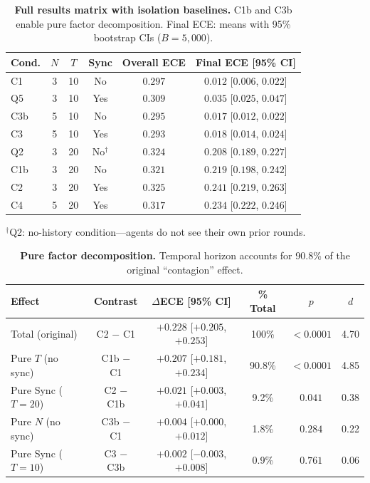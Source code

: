 \documentclass[11pt]{article}
\theoremstyle{definition}
\theoremstyle{remark}
\begin{document}
\begin{table}[H]
\centering
\caption{\textbf{Full results matrix with isolation baselines.} C1b and C3b enable pure factor decomposition. Final ECE: means with 95\% bootstrap CIs ($B{=}5{,}000$).}
\label{tab:results}
\begin{tabular}{@{}lccccc@{}}
\toprule
Cond. & $N$ & $T$ & Sync & Overall ECE & Final ECE [95\% CI] \\
\midrule
C1  & 3 & 10 & No  & $0.297$ & $0.012$ [$0.006$, $0.022$] \\
Q5  & 3 & 10 & Yes & $0.309$ & $0.035$ [$0.025$, $0.047$] \\
C3b & 5 & 10 & No  & $0.295$ & $0.017$ [$0.012$, $0.022$] \\
C3  & 5 & 10 & Yes & $0.293$ & $0.018$ [$0.014$, $0.024$] \\
\midrule
Q2  & 3 & 20 & No$^\dagger$ & $0.324$ & $0.208$ [$0.189$, $0.227$] \\
C1b & 3 & 20 & No  & $0.321$ & $0.219$ [$0.198$, $0.242$] \\
C2  & 3 & 20 & Yes & $0.325$ & $0.241$ [$0.219$, $0.263$] \\
C4  & 5 & 20 & Yes & $0.317$ & $0.234$ [$0.222$, $0.246$] \\
\bottomrule
\end{tabular}
\smallskip
{\footnotesize $^\dagger$Q2: no-history condition---agents do not see their own prior rounds.}
\end{table}

\begin{table}[H]
\centering
\caption{\textbf{Pure factor decomposition.} Temporal horizon accounts for 90.8\% of the original ``contagion'' effect.}
\label{tab:decomp}
\begin{tabular}{@{}lccccc@{}}
\toprule
Effect & Contrast & $\Delta$ECE [95\% CI] & \% Total & $p$ & $d$ \\
\midrule
Total (original) & C2 $-$ C1 & $+0.228$ [$+0.205$, $+0.253$] & 100\% & $<0.0001$ & 4.70 \\
Pure $T$ (no sync) & C1b $-$ C1 & $+0.207$ [$+0.181$, $+0.234$] & 90.8\% & $<0.0001$ & 4.85 \\
Pure Sync ($T{=}20$) & C2 $-$ C1b & $+0.021$ [$+0.003$, $+0.041$] & 9.2\% & $0.041$ & 0.38 \\
Pure $N$ (no sync) & C3b $-$ C1 & $+0.004$ [$+0.000$, $+0.012$] & 1.8\% & $0.284$ & 0.22 \\
Pure Sync ($T{=}10$) & C3 $-$ C3b & $+0.002$ [$-0.003$, $+0.008$] & 0.9\% & $0.761$ & 0.06 \\
\bottomrule
\end{tabular}
\end{table}
\end{document}
